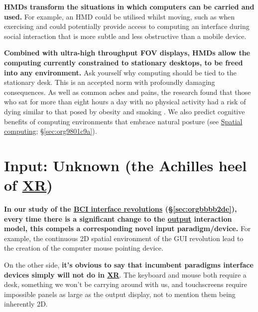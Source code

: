 \documentclass[logo,bsc,singlespacing,parskip]{infthesis}
\begin{document}
\textbf{HMDs transform the situations in which computers can be carried and used.}
For example, an HMD could be utilised whilst moving, such as when exercising and could potentially provide access to computing an interface during social interaction that is more subtle and less obstructive than a mobile device.

\textbf{Combined with ultra-high throughput FOV displays, HMDs allow the computing currently constrained to stationary desktops, to be freed into any environment.}
Ask yourself why computing should be tied to the stationary desk.
This is an accepted norm with profoundly damaging consequences.
As well as common aches and pains, the research found that those who sat for more than eight hours a day with no physical activity had a risk of dying similar to that posed by obesity and smoking \autocite{laskowskiSittingRisksHow}.
We also predict cognitive benefits of computing environments that embrace natural posture (see \hyperref[sec:org9801c9a]{Spatial computing}; \S \ref{sec:org9801c9a}).

\section{Input: Unknown (the Achilles heel of \hyperref[org39cbd51]{XR})}
\label{sec:org93500e2}
\textbf{In our study of the \hyperref[sec:orgbbbb2de]{BCI interface revolutions} (\S \ref{sec:orgbbbb2de}), every time there is a significant change to the \hyperref[output]{output} interaction model, this compels a corresponding novel input paradigm/device.}
For example, the continuous 2D spatial environment of the GUI revolution lead to the creation of the computer mouse pointing device.

On the other side, \textbf{it's obvious to say that incumbent paradigms interface devices simply will not do in \hyperref[org39cbd51]{XR}}.
The keyboard and mouse both require a desk, something we won't be carrying around with us, and touchscreens require impossible panels as large as the output display, not to mention them being inherently 2D.
\end{document}

